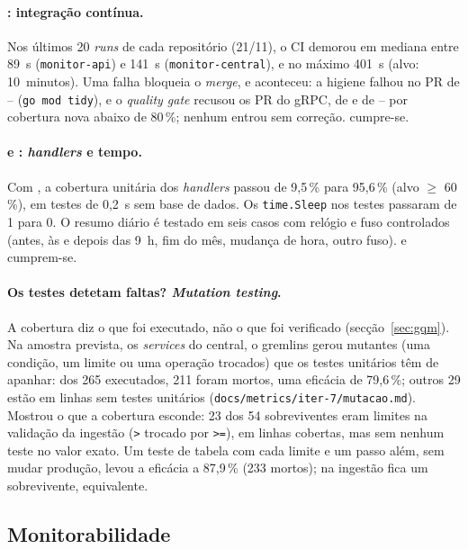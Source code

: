 \paragraph{: integração contínua.}
Nos últimos 20 \emph{runs} de cada repositório (21/11), o CI demorou em mediana entre 89~s (\texttt{monitor-api})
e 141~s (\texttt{monitor-central}), e no máximo 401~s (alvo: 10~minutos). Uma falha bloqueia o \emph{merge}, e
aconteceu: a higiene falhou no PR de -- (\texttt{go mod tidy}), e o \emph{quality gate} recusou os PR
do gRPC, de  e de -- por cobertura nova abaixo de 80\,\%; nenhum entrou sem correção.
 cumpre-se.

\paragraph{ e : \emph{handlers} e tempo.}
Com , a cobertura unitária dos \emph{handlers} passou de 9,5\,\% para 95,6\,\% (alvo $\ge$ 60\,\%), em testes de
0,2~s sem base de dados. Os \texttt{time.Sleep} nos testes passaram de 1 para 0. O resumo diário é testado em seis
casos com relógio e fuso controlados (antes, às e depois das 9~h, fim do mês, mudança de hora, outro fuso).
 e  cumprem-se.


\paragraph{Os testes detetam faltas? \emph{Mutation testing}.}
A cobertura diz o que foi executado, não o que foi verificado (secção~\ref{sec:gqm}). Na amostra prevista, os
\emph{services} do central, o gremlins gerou mutantes (uma condição, um limite ou uma operação trocados) que os
testes unitários têm de apanhar: dos 265 executados, 211 foram mortos, uma eficácia de 79,6\,\%; outros 29 estão em
linhas sem testes unitários (\texttt{docs/metrics/iter-7/mutacao.md}). Mostrou o que a cobertura esconde: 23 dos 54
sobreviventes eram limites na validação da ingestão (\texttt{>} trocado por \texttt{>=}), em linhas cobertas, mas
sem nenhum teste no valor exato. Um teste de tabela com cada limite e um passo além, sem mudar produção, levou a
eficácia a 87,9\,\% (233 mortos); na ingestão fica um sobrevivente, equivalente.

\subsection{Monitorabilidade}
\label{sec:mn}

